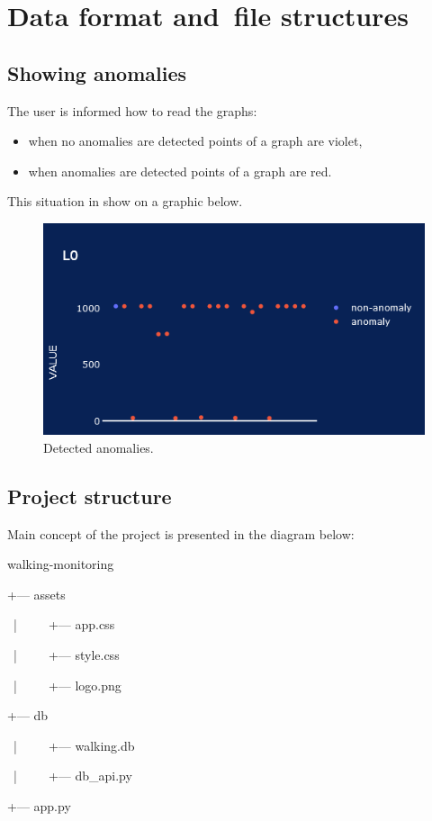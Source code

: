 \documentclass[a4paper,12pt,oneside]{article}
\begin{document}
\section{Data format and~file structures}


\subsection{Showing anomalies}

The user is informed how to read the graphs:
\begin{itemize}
    \item when no anomalies are detected points of a graph are violet,
    \item when anomalies are detected points of a graph are red.
\end{itemize}
This situation in show on a graphic below.

\begin{figure}[ht]
\centering
\includegraphics[width=1\textwidth]{detecAnomaly.PNG}
\caption{Detected anomalies.}
\label{fig:k1}
\end{figure}

\newpage
\subsection{Project structure}

Main concept of the project is presented in the diagram below: \newline

\par walking-monitoring
\par +--- assets
\par \ |\ \ \ \ \  +--- app.css
\par \ |\ \ \ \ \  +--- style.css
\par \ |\ \ \ \ \  +--- logo.png
\par +--- db
\par \ |\ \ \ \ \  +--- walking.db
\par \ |\ \ \ \ \  +--- db\_api.py
\par +--- app.py
\newline
\end{document}
